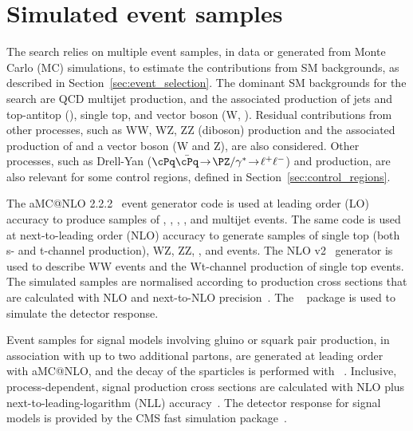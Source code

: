 \section{Simulated event samples}
\label{sec:simulation}

The search relies on multiple event samples, in data or generated from
Monte Carlo (MC) simulations, to estimate the contributions from SM
backgrounds, as described in Section~\ref{sec:event_selection}. 
The dominant SM backgrounds for the search are QCD multijet
production, and the associated production of jets and top-antitop
(\ttbar), single top, and vector boson (W, \znunu). Residual
contributions from other processes, such as WW, WZ, ZZ (diboson)
production and the associated production of \ttbar and a vector boson
(W and Z), are also considered. Other processes, such as Drell-Yan
($\cPq\bar{\cPq}\!  \rightarrow\! \PZ/\gamma^*\! \rightarrow\!
\ell^+\ell^-$) and \gj production, are also relevant for some control
regions, defined in Section~\ref{sec:control_regions}.

The  aMC@NLO 2.2.2~\cite{Alwall2014} event generator code is
used at leading order (LO) accuracy to produce samples of \wj, \zj,
\gj, \ttbar, and multijet events. The same code is used at
next-to-leading order (NLO) accuracy to generate samples of single top
(both s- and t-channel production), WZ, ZZ, \ttw, and \ttz events. The
NLO \POWHEG v2~\cite{powheg, powheg_top_Wt} generator is used to
describe WW events and the Wt-channel production of single top
events. The simulated samples are normalised according to production
cross sections that are calculated with NLO and next-to-NLO
precision~\cite{Alwall2014, wphys, fewz, wwxs, top++, nlotop,
  powheg_top_Wt}. The \GEANTfour~\cite{geant} package is used to
simulate the detector response. 

Event samples for signal models involving gluino or squark pair
production, in association with up to two additional partons, are
generated at leading order with  aMC@NLO, and the decay of
the sparticles is performed with ~\cite{pythia}. Inclusive,
process-dependent, signal production cross sections are calculated
with NLO plus next-to-leading-logarithm (NLL)
accuracy~\cite{Beenakker:1996ch, PhysRevLett.102.111802,
  PhysRevD.80.095004, 1126-6708-2009-12-041,
  doi:10.1142/S0217751X11053560, susynlo}. The detector response for
signal models is provided by the CMS fast simulation
package~\cite{fastsim}.

